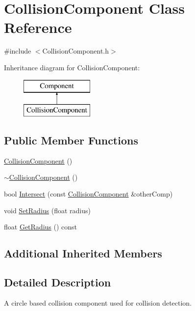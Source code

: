 \hypertarget{class_collision_component}{}\section{Collision\+Component Class Reference}
\label{class_collision_component}


{\ttfamily \#include $<$Collision\+Component.\+h$>$}

Inheritance diagram for Collision\+Component\+:\begin{figure}[H]
\begin{center}
\leavevmode
\includegraphics[height=2.000000cm]{class_collision_component}
\end{center}
\end{figure}
\subsection*{Public Member Functions}
\begin{DoxyCompactItemize}
\item 
\mbox{\hyperlink{class_collision_component_a85c7ca3d9925b6c4bda8c8a2a6140aa9}{Collision\+Component}} ()
\item 
\mbox{\hyperlink{class_collision_component_a8927f6bcecb9862b870426af970ab3b7}{$\sim$\+Collision\+Component}} ()
\item 
bool \mbox{\hyperlink{class_collision_component_a612c1e5c553ef889ec5405bd236c4cef}{Intersect}} (const \mbox{\hyperlink{class_collision_component}{Collision\+Component}} \&other\+Comp)
\item 
void \mbox{\hyperlink{class_collision_component_a4bd86e9646160a141aed8a40704ad5fd}{Set\+Radius}} (float radius)
\item 
float \mbox{\hyperlink{class_collision_component_a3645d98e7ed2c6066d4779243b837e9a}{Get\+Radius}} () const
\end{DoxyCompactItemize}
\subsection*{Additional Inherited Members}


\subsection{Detailed Description}
A circle based collision component used for collision detection. 

